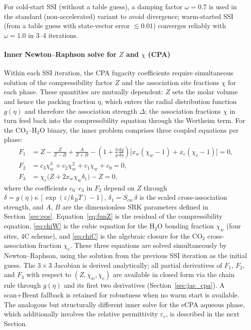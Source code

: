 \documentclass[preprint,12pt,authoryear]{elsarticle}
\begin{document}
For cold-start SSI (without a table guess), a damping factor $\omega = 0.7$ is used
in the standard (non-accelerated) variant to avoid divergence; warm-started SSI
(from a table guess with state-vector error $\lesssim 0.01$) converges reliably with
$\omega = 1.0$ in 3--4 iterations.

\paragraph{Inner Newton--Raphson solve for $Z$ and $\chi$ (CPA)}
Within each SSI iteration, the CPA fugacity coefficients require simultaneous solution of
the compressibility factor $Z$ and the association site fractions $\chi$ for each phase.
These quantities are mutually dependent: $Z$ sets the molar volume and hence the packing
fraction $\eta$, which enters the radial distribution function $g(\eta)$ and therefore the
association strength $\Delta$; the association fractions $\chi$ in turn feed back into the
compressibility equation through the Wertheim term.
For the CO$_2$--H$_2$O binary, the inner problem comprises three coupled equations per phase:
\begin{align}
  F_1 &= Z - \frac{Z}{Z - B} + \frac{A}{Z + B}
         - \left(1 + \frac{\eta}{g}\frac{\mathrm{d}g}{\mathrm{d}\eta}\right)
         \bigl[x_w(\chi_w - 1) + x_c(\chi_c - 1)\bigr] = 0,
         \label{eq:funZ} \\
  F_2 &= c_3 \chi_w^3 + c_2 \chi_w^2 + c_1 \chi_w + c_0 = 0,
         \label{eq:chiW} \\
  F_3 &= \chi_c \bigl(Z + 2 x_w \chi_w \delta_1\bigr) - Z = 0,
         \label{eq:chiC}
\end{align}
where the coefficients $c_0$--$c_3$ in $F_2$ depend on $Z$ through $\delta = g(\eta)\kappa\,[\exp(\varepsilon/k_BT)-1]$,
$\delta_1 = S_{cw}\,\delta$ is the scaled cross-association strength, and
$A$, $B$ are the dimensionless SRK parameters defined in Section~\ref{sec:eos}.
Equation~\eqref{eq:funZ} is the residual of the compressibility equation,
\eqref{eq:chiW} is the cubic equation for the H$_2$O bonding fraction $\chi_w$
(four sites, 4C scheme), and \eqref{eq:chiC} is the algebraic closure for the CO$_2$
cross-association fraction $\chi_c$.
These three equations are solved simultaneously by Newton--Raphson, using the
solution from the previous SSI iteration as the initial guess.
The $3\times 3$ Jacobian is derived analytically; all partial derivatives of $F_1$,
$F_2$, and $F_3$ with respect to $(Z, \chi_w, \chi_c)$ are available in closed form
via the chain rule through $g(\eta)$ and its first two derivatives
(Section~\ref{sec:jac_cpa}).
A scan+Brent fallback is retained for robustness when no warm start is available.
The analogous but structurally different inner solve for the eCPA aqueous phase,
which additionally involves the relative permittivity $\varepsilon_r$, is described
in the next Section.
\end{document}
